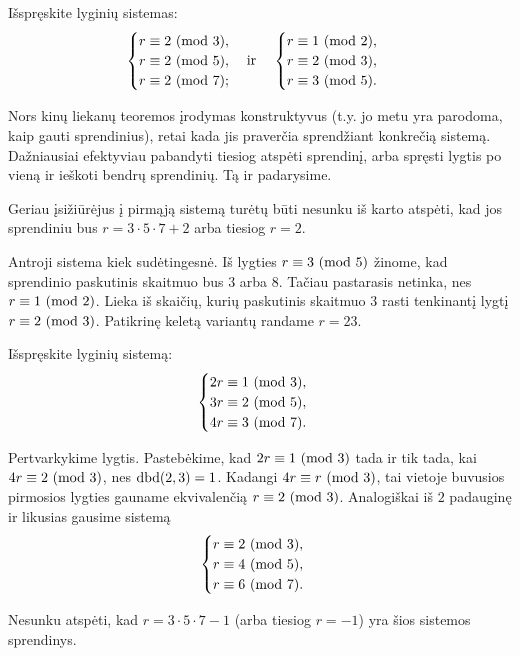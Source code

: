 \begin{pavnr}
  Išspręskite lyginių sistemas:
  $$\begin{cases}
    r \equiv 2 \ (\text{mod } 3),\\
    r \equiv 2 \ (\text{mod } 5),\\
    r \equiv 2 \ (\text{mod } 7);\\
  \end{cases}
  \text{ir }\phantom{ir}
  \begin{cases}
    r \equiv 1 \ (\text{mod } 2),\\
    r \equiv 2 \ (\text{mod } 3),\\
    r \equiv 3 \ (\text{mod } 5).\\
  \end{cases}$$
\end{pavnr}

\begin{sprendimas}
  Nors kinų liekanų teoremos įrodymas konstruktyvus (t.y. jo metu yra parodoma,
  kaip gauti sprendinius), retai kada jis praverčia sprendžiant konkrečią
  sistemą. Dažniausiai efektyviau pabandyti tiesiog atspėti sprendinį, arba
  spręsti lygtis po vieną ir ieškoti bendrų sprendinių. Tą ir padarysime. 
   
  Geriau įsižiūrėjus į pirmąją sistemą turėtų būti nesunku iš karto
  atspėti, kad jos sprendiniu bus $r=3\cdot 5 \cdot 7 +2$ arba tiesiog
  $r=2$. 

  Antroji sistema kiek sudėtingesnė. Iš lygties $r\equiv 3 \ (\text{mod } 5)$ žinome,
  kad sprendinio paskutinis skaitmuo bus $3$ arba $8$. Tačiau pastarasis
  netinka, nes $r \equiv 1 \ (\text{mod } 2)$. Lieka iš skaičių, kurių paskutinis
  skaitmuo $3$ rasti tenkinantį lygtį $r \equiv 2 \ (\text{mod } 3)$. Patikrinę keletą
  variantų randame $r=23$.
\end{sprendimas}

\begin{pavnr}
   Išspręskite lyginių sistemą:
  $$\begin{cases}
    2r \equiv 1 \ (\text{mod } 3),\\
    3r \equiv 2 \ (\text{mod } 5),\\
    4r \equiv 3 \ (\text{mod } 7).\\
  \end{cases}$$
\end{pavnr} 
 
\begin{sprendimas}
  Pertvarkykime lygtis. Pastebėkime, kad $2r \equiv 1 \ (\text{mod } 3)$ tada ir tik
  tada, kai $4r \equiv 2 \ (\text{mod } 3)$, nes $\operatorname{dbd}(2,3) = 1$. Kadangi $4r \equiv r
  \ (\text{mod } 3)$, tai vietoje buvusios pirmosios lygties gauname ekvivalenčią
  $r \equiv 2 \ (\text{mod } 3)$. Analogiškai iš $2$ padauginę ir likusias gausime
  sistemą
  $$\begin{cases}
    r \equiv 2 \ (\text{mod } 3),\\
    r \equiv 4 \ (\text{mod } 5),\\
    r \equiv 6 \ (\text{mod } 7).
  \end{cases}$$

  Nesunku atspėti, kad $r=3\cdot 5 \cdot 7-1$ (arba tiesiog $r=-1$) yra šios
  sistemos sprendinys.

\end{sprendimas}

